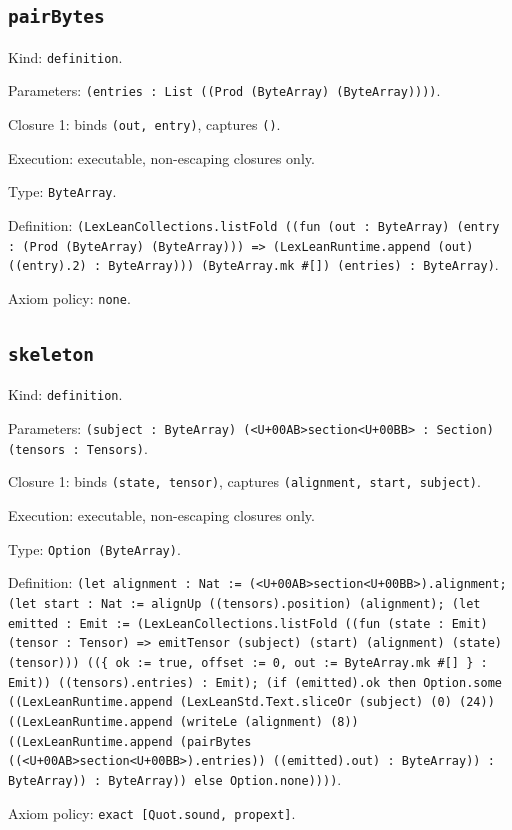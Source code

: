 \documentclass[11pt]{article}
\begin{document}
\subsection*{\texttt{pairBytes}}
\noindent Kind: \texttt{definition}.\par
\noindent Parameters: \texttt{(entries : List ((Prod (ByteArray) (ByteArray))))}.\par
\noindent Closure 1: binds \texttt{(out, entry)}, captures \texttt{()}.\par
\noindent Execution: executable, non-escaping closures only.\par
\noindent Type: \texttt{ByteArray}.\par
\noindent Definition: \texttt{(LexLeanCollections.listFold ((fun (out : ByteArray) (entry : (Prod (ByteArray) (ByteArray))) => (LexLeanRuntime.append (out) ((entry).2) : ByteArray))) (ByteArray.mk \#[]) (entries) : ByteArray)}.\par
\noindent Axiom policy: \texttt{none}.\par
\subsection*{\texttt{skeleton}}
\noindent Kind: \texttt{definition}.\par
\noindent Parameters: \texttt{(subject : ByteArray) (<U+00AB>section<U+00BB> : Section) (tensors : Tensors)}.\par
\noindent Closure 1: binds \texttt{(state, tensor)}, captures \texttt{(alignment, start, subject)}.\par
\noindent Execution: executable, non-escaping closures only.\par
\noindent Type: \texttt{Option (ByteArray)}.\par
\noindent Definition: \texttt{(let alignment : Nat := (<U+00AB>section<U+00BB>).alignment; (let start : Nat := alignUp ((tensors).position) (alignment); (let emitted : Emit := (LexLeanCollections.listFold ((fun (state : Emit) (tensor : Tensor) => emitTensor (subject) (start) (alignment) (state) (tensor))) ((\{ ok := true, offset := 0, out := ByteArray.mk \#[] \} : Emit)) ((tensors).entries) : Emit); (if (emitted).ok then Option.some ((LexLeanRuntime.append (LexLeanStd.Text.sliceOr (subject) (0) (24)) ((LexLeanRuntime.append (writeLe (alignment) (8)) ((LexLeanRuntime.append (pairBytes ((<U+00AB>section<U+00BB>).entries)) ((emitted).out) : ByteArray)) : ByteArray)) : ByteArray)) else Option.none))))}.\par
\noindent Axiom policy: \texttt{exact [Quot.sound, propext]}.\par
\end{document}
